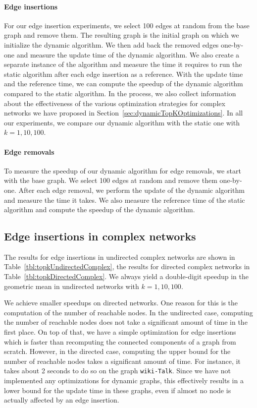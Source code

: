 \paragraph{Edge insertions}
For our edge insertion experiments, we select 100 edges at random from the base graph and remove them. The resulting graph is the initial graph on which we initialize the dynamic algorithm. We then add back the removed edges one-by-one and measure the update time of the dynamic algorithm. We also create a separate instance of the algorithm and measure the time it requires to run the static algorithm after each edge insertion as a reference. With the update time and the reference time, we can compute the speedup of the dynamic algorithm compared to the static algorithm. In the process, we also collect information about the effectiveness of the various optimization strategies for complex networks we have proposed in Section~\ref{sec:dynamicTopKOptimizations}. In all our experiments, we compare our dynamic algorithm with the static one with $k = 1, 10, 100$.

\paragraph{Edge removals}
To measure the speedup of our dynamic algorithm for edge removals, we start with the base graph. We select 100 edges at random and remove them one-by-one. After each edge removal, we perform the update of the dynamic algorithm and measure the time it takes. We also measure the reference time of the static algorithm and compute the speedup of the dynamic algorithm.

\subsection{Edge insertions in complex networks}
The results for edge insertions in undirected complex networks are shown in Table~\ref{tbl:topkUndirectedComplex}, the results for directed complex networks in Table~\ref{tbl:topkDirectedComplex}. We always yield a double-digit speedup in the geometric mean in undirected networks with $k = 1, 10, 100$.

We achieve smaller speedups on directed networks. One reason for this is the computation of the number of reachable nodes. In the undirected case, computing the number of reachable nodes does not take a significant amount of time in the first place. On top of that, we have a simple optimization for edge insertions which is faster than recomputing the connected components of a graph from scratch. However, in the directed case, computing the upper bound for the number of reachable nodes takes a significant amount of time. For instance, it takes about 2 seconds to do so on the graph \texttt{wiki-Talk}. Since we have not implemented any optimizations for dynamic graphs, this effectively results in a lower bound for the update time in these graphs, even if almost no node is actually affected by an edge insertion.

